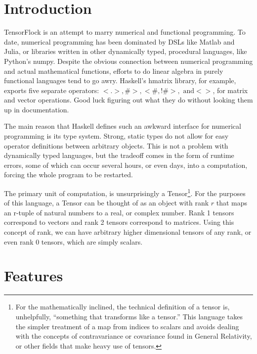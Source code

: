 \documentclass[12pt]{article}
\begin{document}
\maketitle

\section{Introduction}
TensorFlock is an attempt to marry numerical and functional programming.
To date, numerical programming has been dominated by DSLs like Matlab and
Julia, or libraries written in other dynamically typed, procedural languages,
like Python's numpy. Despite the obvious connection between numerical
programming and actual mathematical functions, efforts to do linear algebra in
purely functional languages tend to go awry. Haskell's hmatrix library, for
example, exports five separate operators: $<.>, \#>, <\#, !\#>, \text{ and} <>$, for
matrix and vector operations. Good luck figuring out what they do without
looking them up in documentation.

The main reason that Haskell defines such an awkward interface for numerical
programming is its type system. Strong, static types do not allow for easy
operator definitions between arbitrary objects. This is not a problem with
dynamically typed languages, but the tradeoff comes in the form of runtime
errors, some of which can occur several hours, or even days, into
a computation, forcing the whole program to be restarted. 

The primary unit of computation, is unsurprisingly a Tensor\footnote{For the
mathematically inclined, the technical definition of a tensor is, unhelpfully,
``something that transforms like a tensor.'' This language takes the simpler
treatment of a map from indices to scalars and avoids dealing with the concepts
of contravariance or covariance found in General Relativity, or other fields
that make heavy use of tensors.}. 
For the purposes
of this language, a Tensor can be thought of as an object with rank $r$ that
maps an r-tuple of natural numbers to a real, or complex number. Rank 1 tensors
correspond to vectors and rank 2 tensors correspond to matrices. Using this
concept of rank, we can have arbitrary higher dimensional tensors of any rank,
or even rank 0 tensors, which are simply scalars.

\section{Features}
\end{document}
